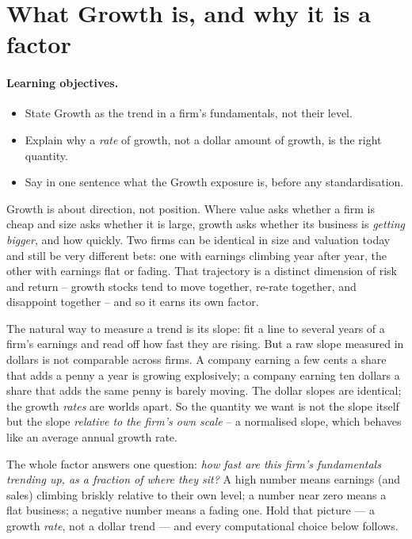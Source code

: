 \documentclass[11pt]{article}
\theoremstyle{definition}
\theoremstyle{plain}
\theoremstyle{remark}
\begin{document}
\tableofcontents
\bigskip

\section{What Growth is, and why it is a factor}\label{sec:what}

\paragraph{Learning objectives.}
\begin{itemize}[leftmargin=1.4em,topsep=2pt]
  \item State Growth as the trend in a firm's fundamentals, not their level.
  \item Explain why a \emph{rate} of growth, not a dollar amount of growth, is the right quantity.
  \item Say in one sentence what the Growth exposure is, before any standardisation.
\end{itemize}

Growth is about direction, not position. Where value asks whether a firm is cheap and size asks whether it is large, growth asks whether its business is \emph{getting bigger}, and how quickly. Two firms can be identical in size and valuation today and still be very different bets: one with earnings climbing year after year, the other with earnings flat or fading. That trajectory is a distinct dimension of risk and return -- growth stocks tend to move together, re-rate together, and disappoint together -- and so it earns its own factor.

The natural way to measure a trend is its slope: fit a line to several years of a firm's earnings and read off how fast they are rising. But a raw slope measured in dollars is not comparable across firms. A company earning a few cents a share that adds a penny a year is growing explosively; a company earning ten dollars a share that adds the same penny is barely moving. The dollar slopes are identical; the growth \emph{rates} are worlds apart. So the quantity we want is not the slope itself but the slope \emph{relative to the firm's own scale} -- a normalised slope, which behaves like an average annual growth rate.

\begin{intuition}
The whole factor answers one question: \emph{how fast are this firm's fundamentals trending up, as a fraction of where they sit?} A high number means earnings (and sales) climbing briskly relative to their own level; a number near zero means a flat business; a negative number means a fading one. Hold that picture --- a growth \emph{rate}, not a dollar trend --- and every computational choice below follows.
\end{intuition}
\end{document}

